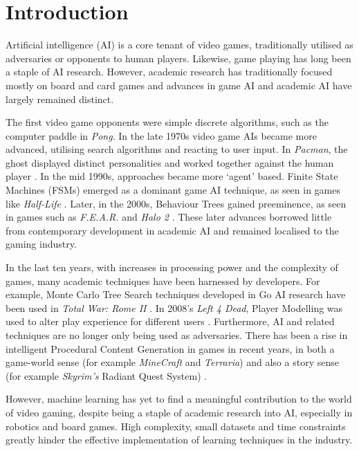 

\section{Introduction}

Artificial intelligence (AI) is a core tenant of video games, traditionally utilised as adversaries or opponents to human players. Likewise, game playing has long been a staple of AI research. However, academic research has traditionally focused mostly on board and card games and advances in game AI and academic AI have largely remained distinct.

The first video game opponents were simple discrete algorithms, such as the computer paddle in \emph{Pong}. In the late 1970s video game AIs became more advanced, utilising search algorithms and reacting to user input. In \emph{Pacman}, the ghost displayed distinct personalities and worked together against the human player \cite{pacmanghosts}. In the mid 1990s, approaches became more `agent' based. Finite State Machines (FSMs) emerged as a dominant game AI technique, as seen in games like \emph{Half-Life} \cite{halflife}. Later, in the 2000s, Behaviour Trees gained preeminence, as seen in games such as \emph{F.E.A.R.} \cite{fear} and \emph{Halo 2} \cite{halo}. These later advances borrowed little from contemporary development in academic AI and remained localised to the gaming industry.

In the last ten years, with increases in processing power and the complexity of games, many academic techniques have been harnessed by developers. For example, Monte Carlo Tree Search techniques developed in Go AI research have been used in \emph{Total War: Rome II} \cite{rome}. In 2008's \emph{Left 4 Dead}, Player Modelling was used to alter play experience for different users \cite[p.~10]{playermod}. Furthermore, AI and related techniques are no longer only being used as adversaries. There has been a rise in intelligent Procedural Content Generation in games in recent years, in both a game-world sense (for example \emph{MineCraft} and \emph{Terraria}) and also a story sense (for example \emph{Skyrim's} Radiant Quest System) \cite{skyrim}.

However, machine learning has yet to find a meaningful contribution to the world of video gaming, despite being a staple of academic research into AI, especially in robotics and board games. High complexity, small datasets and time constraints greatly hinder the effective implementation of learning techniques in the industry.


